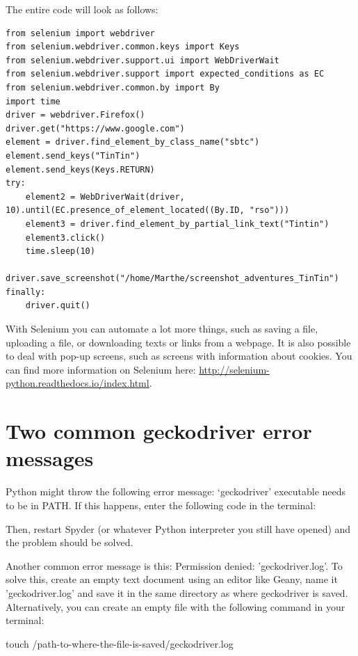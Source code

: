 \documentclass[a4paper,12pt]{book}
\begin{document}
\begin{appendices}
The entire code will look as follows:
\begin{lstlisting}
from selenium import webdriver
from selenium.webdriver.common.keys import Keys
from selenium.webdriver.support.ui import WebDriverWait
from selenium.webdriver.support import expected_conditions as EC 
from selenium.webdriver.common.by import By
import time
driver = webdriver.Firefox()
driver.get("https://www.google.com")  
element = driver.find_element_by_class_name("sbtc")
element.send_keys("TinTin")
element.send_keys(Keys.RETURN)
try:
    element2 = WebDriverWait(driver, 10).until(EC.presence_of_element_located((By.ID, "rso")))
    element3 = driver.find_element_by_partial_link_text("Tintin")
    element3.click()
    time.sleep(10)
    driver.save_screenshot("/home/Marthe/screenshot_adventures_TinTin")
finally:
    driver.quit()
\end{lstlisting}



With Selenium you can automate a lot more things, such as saving a file, uploading a file, or downloading texts or links from a webpage. It is also possible to deal with pop-up screens, such as screens with information about cookies. You can find more information on Selenium here: \url{http://selenium-python.readthedocs.io/index.html}.

\section*{Two common geckodriver error messages}

Python might throw the following error message: ‘geckodriver’ executable needs to be in PATH. If this happens, enter the following code in the terminal:


Then, restart Spyder (or whatever Python interpreter you still have opened) and the problem should be solved.

Another common error message is this: Permission denied: 'geckodriver.log'. To solve this, create an empty text document using an editor like Geany, name it 'geckodriver.log' and save it in the same directory as where geckodriver is saved. Alternatively, you can create an empty file with the following command in your terminal:
\begin{lstlistingbash}
touch /path-to-where-the-file-is-saved/geckodriver.log
\end{lstlistingbash}


\end{appendices}
\end{document}
